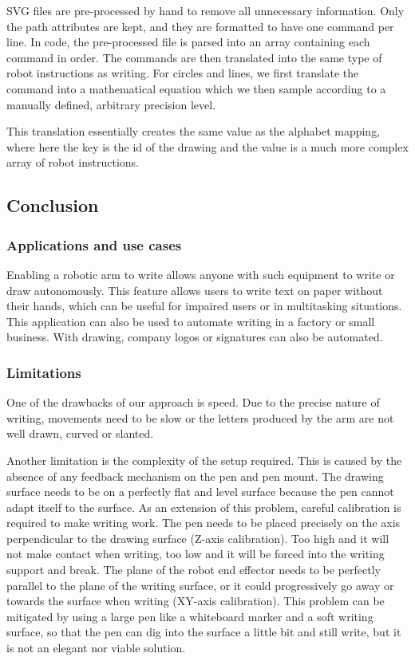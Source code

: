 SVG files are pre-processed by hand to remove all unnecessary information. Only the path attributes are kept, and they are formatted to have one command per line. In code, the pre-processed file is parsed into an array containing each command in order. The commands are then translated into the same type of robot instructions as writing. For circles and lines, we first translate the command into a mathematical equation which we then sample according to a manually defined, arbitrary precision level.

This translation essentially creates the same value as the alphabet mapping, where here the key is the id of the drawing and the value is a much more complex array of robot instructions.


\subsection{Conclusion}

\subsubsection{Applications and use cases}

Enabling a robotic arm to write allows anyone with such equipment to write or draw autonomously. This feature allows users to write text on paper without their hands, which can be useful for impaired users or in multitasking situations. This application can also be used to automate writing in a factory or small business. With drawing, company logos or signatures can also be automated.

\subsubsection{Limitations}

One of the drawbacks of our approach is speed. Due to the precise nature of writing, movements need to be slow or the letters produced by the arm are not well drawn, curved or slanted.

Another limitation is the complexity of the setup required. This is caused by the absence of any feedback mechanism on the pen and pen mount. The drawing surface needs to be on a perfectly flat and level surface because the pen cannot adapt itself to the surface. As an extension of this problem, careful calibration is required to make writing work. The pen needs to be placed precisely on the axis perpendicular to the drawing surface (Z-axis calibration). Too high and it will not make contact when writing, too low and it will be forced into the writing support and break. The plane of the robot end effector needs to be perfectly parallel to the plane of the writing surface, or it could progressively go away or towards the surface when writing (XY-axis calibration). This problem can be mitigated by using a large pen like a whiteboard marker and a soft writing surface, so that the pen can dig into the surface a little bit and still write, but it is not an elegant nor viable solution.

